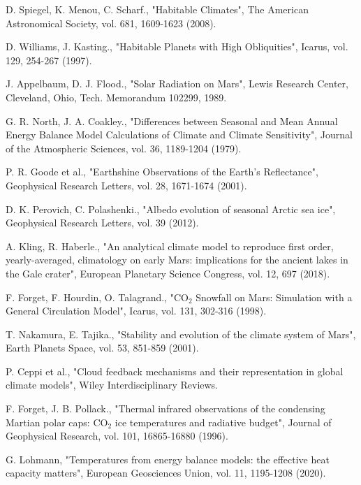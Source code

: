 \documentclass[12pt,onecolumn]{revtex4-2}    %
\begin{document}
%
\begin{thebibliography}{}

 D. Spiegel, K. Menou, C. Scharf., "Habitable Climates", The American Astronomical Society, vol. 681, 1609-1623 (2008).

 D. Williams, J. Kasting., "Habitable Planets with High Obliquities", Icarus, vol. 129, 254-267 (1997).

 J. Appelbaum, D. J. Flood., "Solar Radiation on Mars", Lewis Research Center, Cleveland, Ohio, Tech. Memorandum 102299, 1989.

 G. R. North, J. A. Coakley., "Differences between Seasonal and Mean Annual Energy Balance Model Calculations of Climate and Climate Sensitivity", Journal of the Atmospheric Sciences, vol. 36, 1189-1204 (1979).

 P. R. Goode et al., "Earthshine Observations of the Earth's Reflectance", Geophysical Research Letters, vol. 28, 1671-1674 (2001).

 D. K. Perovich, C. Polashenki., "Albedo evolution of seasonal Arctic sea ice", Geophysical Research Letters, vol. 39 (2012).

 A. Kling, R. Haberle., "An analytical climate model to reproduce first order, yearly-averaged, climatology on early Mars: implications for the ancient lakes in the Gale crater", European Planetary Science Congress, vol. 12, 697 (2018).

 F. Forget, F. Hourdin, O. Talagrand., "$\mathrm{CO_2}$ Snowfall on Mars: Simulation with a General Circulation Model", Icarus, vol. 131, 302-316 (1998).

 T. Nakamura, E. Tajika., "Stability and evolution of the climate system of Mars", Earth Planets Space, vol. 53, 851-859 (2001).

 P. Ceppi et al., "Cloud feedback mechanisms and their representation in global climate models", Wiley Interdisciplinary Reviews.

 F. Forget, J. B. Pollack., "Thermal infrared observations of the condensing Martian polar caps: $\mathrm{CO_2}$ ice temperatures and radiative budget", Journal of Geophysical Research, vol. 101, 16865-16880 (1996).

 G. Lohmann, "Temperatures from energy balance models: the effective heat capacity matters", European Geosciences Union, vol. 11, 1195-1208 (2020).


\end{thebibliography}
\end{document}
